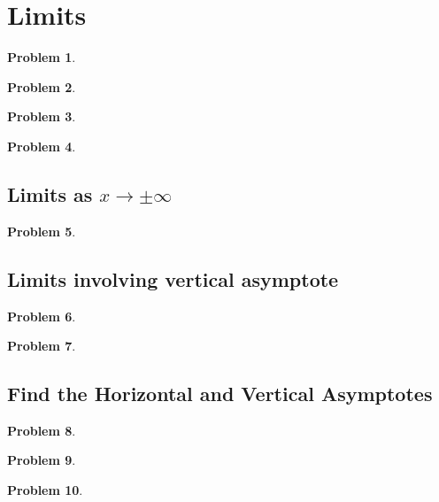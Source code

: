 \documentclass{article}
\newtheorem{problem}{Problem}
\begin{document}
\section{Limits}
\begin{problem}

\end{problem}
\begin{problem}

\end{problem}

\begin{problem}

\end{problem}
\begin{problem}

\end{problem}
\subsection{Limits as $x\to\pm \infty$}
\begin{problem}

\end{problem}

\subsection{Limits involving vertical asymptote}
\begin{problem}

\end{problem}
\begin{problem}

\end{problem}
\subsection{Find the Horizontal and Vertical Asymptotes}
\begin{problem}

\end{problem}
\begin{problem}

\end{problem}
\begin{problem}

\end{problem}
\end{document}
